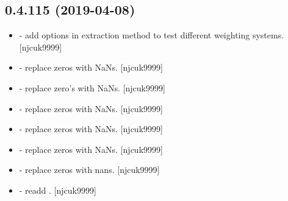 \documentclass[a4paper,10pt,english]{report}
\begin{document}
\subsection{0.4.115 (2019-04-08)}
\label{\detokenize{misc/changelog:id146}}\begin{itemize}
\item {} 
 - add options in extraction method to test different
weighting systems. {[}njcuk9999{]}

\item {} 
 - replace zeros with NaNs. {[}njcuk9999{]}

\item {} 
 - replace zero’s with NaNs. {[}njcuk9999{]}

\item {} 
 - replace zeros with NaNs. {[}njcuk9999{]}

\item {} 
 - replace zeros with NaNs. {[}njcuk9999{]}

\item {} 
 - replace zeros with NaNs. {[}njcuk9999{]}

\item {} 
 - replace zeros with nans. {[}njcuk9999{]}

\item {} 
 - readd . {[}njcuk9999{]}

\end{itemize}
\end{document}

